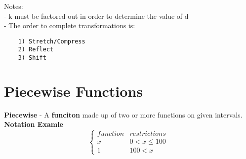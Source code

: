 \documentclass{article}
\begin{document}
    \noindent
    Notes:\\
    - k must be factored out in order to determine the value of d\\
    - The order to complete transformations is:
    \begin{verbatim}
    1) Stretch/Compress
    2) Reflect
    3) Shift
    \end{verbatim}


\section*{Piecewise Functions}

\textbf{Piecewise} - A \textbf{funciton} made up of two or more functions on given intervals.\\
\textbf{Notation Examle}\\
\[ \begin{cases} 
    function & restrictions \\
    x & 0 < x\leq 100 \\
    1 & 100 < x 
 \end{cases}
\]


\end{document}
